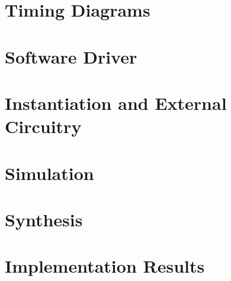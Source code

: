 \documentclass{\TEX/ug/ug}
\begin{document}
\ifdefined\TD
\section{Timing Diagrams}
\label{sec:td}

\fi

\ifdefined\SW
\section{Software Driver}
\label{sec:sw}

\fi

\section{Instantiation and External Circuitry}
\label{sec:inst}


\section{Simulation}
\label{sec:tbbd}


\section{Synthesis}
\label{sec:synth}


\section{Implementation Results}
\label{sec:results}


\ifdefined\CUSTOM

\fi
\end{document}
